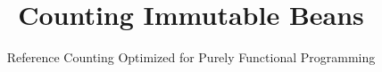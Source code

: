 \newtheorem{lem}{Lemma}
\newtheorem{thm}{Theorem}
\newtheorem{cor}{Corollary}
\newtheorem{defn}{Definition}
\DeclareMathOperator{\dom}{dom}
\DeclareMathOperator{\ran}{ran}
\DeclareMathOperator{\dec}{dec}
\DeclareMathOperator{\inc}{inc}
\DeclareMathOperator{\live}{live}
\DeclareMathOperator{\vars}{vars}
\DeclareMathOperator{\erase}{erase}
\DeclareMathOperator{\FV}{FV}
\DeclareMathOperator{\valof}{valof}
\DeclareMathOperator{\reachable}{reachable}
\newcommand\RC{_{\textit{RC}}}
\newcommand\rcIR{\ensuremath{\lambda\RC}}
\def\Reset#1{\kw{reset}\ #1}
\def\Reuse_#1#2#3{\kw{reuse}\ #2\ \kw{in}\ \kw{ctor}_#1\ #3}
\def\Inc#1;#2{\kw{inc}\ #1;\ #2}
\def\Dec#1;#2{\kw{dec}\ #1;\ #2}

\newcommand{\var}[1]{\texttt{#1}}
\newcommand\abs[1]{\mid #1 \mid}

\newcommand\pure{_{\textit{pure}}}
\newcommand\pureIR{\ensuremath{\lambda\pure}}
\newcommand\psem[3]{#1 \vdash #2 \Downarrow #3}
\newcommand\ty[1]{\mathit{#1}}
\newcommand\syncat[1]{&\in \ty{#1}}
\newcommand\kw[1]{\texttt{\textbf{#1}}}
\newcommand\many[1]{\overline{#1}}
\newcommand\rcsem[5]{#1 \vdash \langle #2, #3 \rangle \Downarrow \langle #4, #5 \rangle}
\newcommand\nullptr{\rule{0.5em}{0.5em}}

\def\Pap#1#2{\kw{pap}\ #1\ #2}
\def\Ctor_#1#2{\kw{ctor}_#1\ #2}
\def\Proj_#1#2{\kw{proj}_#1\ #2}
\def\Ret#1{\kw{ret}\ #1}
\def\Let#1=#2;#3{\kw{let}\ #1 = #2;\ #3}
\def\Case#1#2{\kw{case}\ #1\ \kw{of}\ #2}
\def\Lambda#1.#2{\lambda\ #1.\ #2}

\newcommand\own{\ensuremath{\mathbb{O}}}
\newcommand\bor{\ensuremath{\mathbb{B}}}
\newcommand\reset{\ensuremath{\mathbb{R}}}
\newcommand\reuse{_{\textit{reuse}}}
\newcommand\squote{\textnormal{\textquotesingle}}

\title{Counting Immutable Beans}
\subtitle{Reference Counting Optimized for Purely Functional Programming}



